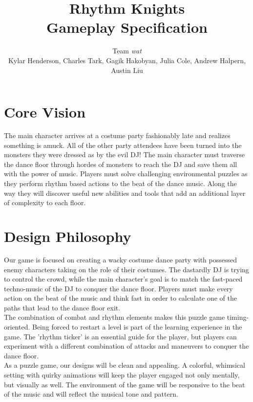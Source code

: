 \documentclass[]{article}
\begin{document}
\title{\textbf{Rhythm Knights} \\ Gameplay Specification}
\author{Team \emph{wat} \\
\small{Kylar Henderson, Charles Tark, 
Gagik Hakobyan, Julia Cole, Andrew Halpern, Austin Liu}}
\date{} %
\maketitle

\section*{Core Vision}
The main character arrives at a costume party fashionably late and
realizes something is amuck. All of the other party attendees have
been turned into the monsters they were dressed as by the evil DJ! The
main character must traverse the dance floor through hordes of
monsters to reach the DJ and save them all with the power of
music. Players must solve challenging environmental puzzles as they
perform rhythm based actions to the beat of the dance music. Along the
way they will discover useful new abilities and tools that add an
additional layer of complexity to each floor.

\section*{Design Philosophy}

Our game is focused on creating a wacky costume dance party with
possessed enemy characters taking on the role of their costumes. The
dastardly DJ is trying to control the crowd, while the main
character's goal is to match the fast-paced techno-music of the DJ to
conquer the dance floor. Players must make every action on the beat of
the music and think fast in order to calculate one of the paths that
lead to the dance floor exit.\\

The combination of combat and rhythm elements makes this puzzle game
timing-oriented. Being forced to restart a level is part of the
learning experience in the game. The 'rhythm ticker' is an essential
guide for the player, but players can experiment with a different
combination of attacks and maneuvers to conquer the dance floor.\\

As a puzzle game, our designs will be clean and appealing. A colorful,
whimsical setting with quirky animations will keep the player engaged
not only mentally, but visually as well. The environment of the game
will be responsive to the beat of the music and will reflect the
musical tone and pattern.
\end{document}
